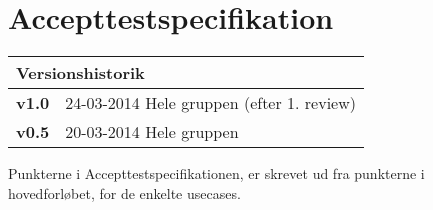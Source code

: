 \chapter{Accepttestspecifikation}

\begin{table}[!htbp] \centering
\begin{tabular}{|p{2cm}|p{8cm}|}
	\hline
		\multicolumn{2}{|l|}{Versionshistorik} \\ \hline
		\textbf{v1.0} &24-03-2014 Hele gruppen (efter 1. review) \\ \hline
		\textbf{v0.5} &20-03-2014 Hele gruppen \\ \hline
	\end{tabular}
\end{table}

Punkterne i Accepttestspecifikationen, er skrevet ud fra punkterne i hovedforløbet, for de enkelte usecases.

















